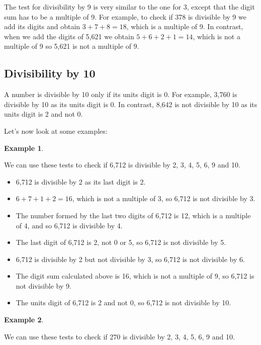 \documentclass[11pt, oneside]{article}
\theoremstyle{definition}
\newtheorem{exmp}{Example}[section]
\begin{document}
The test for divisibility by 9 is very similar to the one for 3, except that the digit sum has to be a multiple of 9. For example, to check if 378 is divisible by 9 we add its digits and obtain $3 + 7 + 8 = 18$, which is a multiple of 9. In contrast, when we add the digits of 5,621 we obtain $5 + 6 + 2 + 1 = 14$, which is not a multiple of 9 so 5,621 is not a multiple of 9.

\subsection{Divisibility by 10}
A number is divisible by 10 only if its units digit is 0. For example, 3,760 is divisible by 10 as its units digit is 0. In contrast, 8,642 is not divisible by 10 as its units digit is 2 and not 0.

Let's now look at some examples:

\begin{exmp} \end{exmp}
We can use these tests to check if 6,712 is divisible by 2, 3, 4, 5, 6, 9 and 10.

\begin{itemize}
\item 6,712 is divisible by 2 as its last digit is 2.
\item $6 + 7 + 1 + 2 = 16$, which is not a multiple of 3, so 6,712 is not divisible by 3.
\item The number formed by the last two digits of 6,712 is 12, which is a multiple of 4, and so 6,712 is divisible by 4.
\item The last digit of 6,712 is 2, not 0 or 5, so 6,712 is not divisible by 5.
\item 6,712 is divisible by 2 but not divisible by 3, so 6,712 is not divisible by 6.
\item The digit sum calculated above is 16, which is not a multiple of 9, so 6,712 is not divisible by 9.
\item The units digit of 6,712 is 2 and not 0, so 6,712 is not divisible by 10.
\end{itemize}

\begin{exmp} \end{exmp}
We can use these tests to check if 270 is divisible by 2, 3, 4, 5, 6, 9 and 10.
\end{document}
